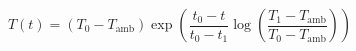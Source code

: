 \documentclass[preview]{standalone}
\begin{document}
\begin{equation*}
    T(t) = \left( T_0 - T_\mathrm{amb} \right) \exp\left( \frac{t_0 - t}{t_0 - t_1}\log\left( \frac{T_1 - T_\mathrm{amb}}{T_0 - T_\mathrm{amb}} \right) \right)
\end{equation*}
\end{document}
